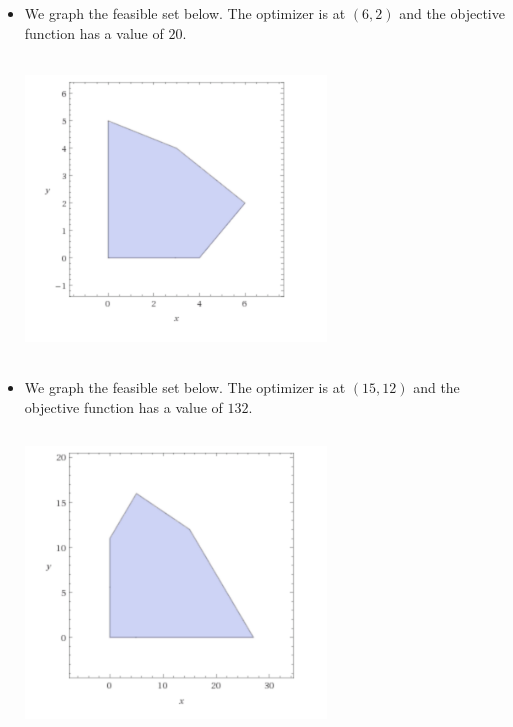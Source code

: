 \documentclass[12pt]{article}
\newenvironment{problem}[2][Problem]{\begin{trivlist}
\item[\hskip \labelsep {\bfseries #1}\hskip \labelsep {\bfseries #2}]}{\end{trivlist}}
\begin{document}
\begin{problem}{8.2.}\hfill
\begin{itemize}
\item[(i)]We graph the feasible set below. The optimizer is at $(6, 2)$ and the objective function has a value of $20$. 
\begin{center}
\includegraphics[width=8cm, height=8cm]{prob8i}
\end{center}
\item[(ii)]We graph the feasible set below. The optimizer is at $(15, 12)$ and the objective function has a value of $132$. 
\begin{center}
\includegraphics[width=8cm, height=8cm]{prob8ii}
\end{center}
\end{itemize}
\end{problem}

\begin{problem}{8.5.}
\end{problem}

\begin{problem}{8.7.} 
\end{problem}
\end{document}
